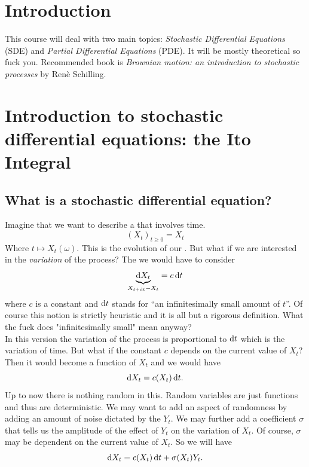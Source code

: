 \documentclass[crop=false, class=article]{standalone}
\begin{document}
\section{Introduction}
This course will deal with two main topics: \emph{Stochastic Differential Equations} (SDE) and \emph{Partial Differential Equations} (PDE). It will be mostly theoretical so fuck you. Recommended book is \textit{Brownian motion: an introduction to stochastic processes} by Renè Schilling.
\section{Introduction to stochastic differential equations: the Ito Integral}
\subsection{What is a stochastic differential equation?}
Imagine that we want to describe a \rp{} that involves time.
\begin{equation*}
	{(X_{t})}_{t\geq0}=X_{t}
\end{equation*}
Where $t\mapsto X_{t}(\omega)$. This is the evolution of our \rp{}. But what if we are interested in the \textit{variation} of the process? The we would have to consider
\begin{equation*}
	\underbrace{\mathop{}\!\mathrm{d} X_{t}}_{X_{t+\mathop{}\!\mathrm{d} t}-X_{t}}=c \mathop{}\!\mathrm{d} t
\end{equation*}
where $c$ is a constant and $\mathop{}\!\mathrm{d} t$ stands for ``an infinitesimally small amount of $t$''. Of course this notion is strictly heuristic and it is all but a rigorous definition. What the fuck does "infinitesimally small" mean anyway?\\
In this version the variation of the process is proportional to $\mathop{}\!\mathrm{d} t$ which is the variation of time. But what if the constant $c$ depends on the current value of $X_{t}$? Then it would become a function of $X_{t}$ and we would have
\begin{equation*}
	\mathop{}\!\mathrm{d} X_{t}=c(X_{t})\mathop{}\!\mathrm{d} t.
\end{equation*}
Up to now there is nothing random in this. Random variables are just functions and thus are deterministic. We may want to add an aspect of randomness by adding an amount of noise dictated by the \rv{} $Y_{t}$. We may further add a coefficient $\sigma$ that tells us the amplitude of the effect of $Y_{t}$ on the variation of $X_{t}$. Of course, $\sigma$ may be dependent on the current value of $X_{t}$. So we will have
\begin{equation*}
	\mathop{}\!\mathrm{d} X_{t}=c(X_{t})\mathop{}\!\mathrm{d} t+\sigma(X_{t})Y_{t}.
\end{equation*}
\end{document}
